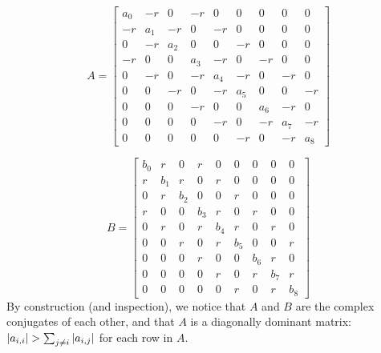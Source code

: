     \begin{equation}
        A = 
        \begin{bmatrix} 
            a_0 & -r  & 0 & -r & 0 & 0 & 0 & 0 & 0 \\
            -r  & a_1 & -r & 0 & -r & 0 & 0 & 0 & 0 \\
             0  & -r  & a_2 & 0 & 0 & -r & 0 & 0 & 0 \\
            -r  & 0   & 0 & a_3 & -r & 0 & -r & 0 & 0 \\
             0  & -r  & 0 & -r & a_4 & -r & 0 & -r & 0 \\ 
             0  & 0   & -r & 0 & -r & a_5 & 0 & 0 & -r \\
             0  & 0   & 0 & -r & 0 & 0 & a_6 & -r & 0 \\
             0  & 0   & 0 & 0 & -r & 0 & -r & a_7 & -r \\
             0  & 0   & 0 & 0 & 0 & -r & 0 & -r & a_8  
        \end{bmatrix}
    \end{equation}

    \begin{equation}
        B = 
        \begin{bmatrix} 
            b_0 & r & 0 & r & 0 & 0 & 0 & 0 & 0 \\
            r & b_1 & r & 0 & r & 0 & 0 & 0 & 0 \\
            0 & r & b_2 & 0 & 0 & r & 0 & 0 & 0 \\
            r & 0 & 0 & b_3 & r & 0 & r & 0 & 0 \\
            0 & r & 0 & r & b_4 & r & 0 & r & 0 \\
            0 & 0 & r & 0 & r & b_5 & 0 & 0 & r \\
            0 & 0 & 0 & r & 0 & 0 & b_6 & r & 0 \\
            0 & 0 & 0 & 0 & r & 0 & r & b_7 & r \\
            0 & 0 & 0 & 0 & 0 & r & 0 & r & b_8
        \end{bmatrix}
    \end{equation}
By construction (and inspection), we notice that $A$ and $B$ are the complex conjugates of each other, and that $A$ is a diagonally dominant matrix: $\abs{a_{i,i}} > \sum_{j\neq i}\abs{a_{i,j}}$ for each row in $A$.